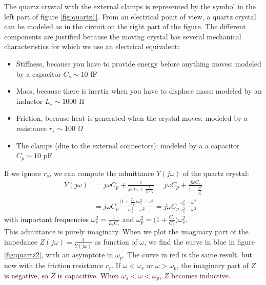 The quartz crystal with the external clamps is represented by the symbol in the left part of figure \ref{fig:quartz1}. From an electrical point of view, a quartz crystal can be modeled as in the circuit on the right part of the figure. The different components are justified because the moving crystal has several mechanical characteristics for which we use an electrical equivalent:
\begin{itemize}
	\item Stiffness, because you have to provide energy before anything moves: modeled by a capacitor $C_s \sim 10$ fF
	\item Mass, because there is inertia when you have to displace mass: modeled by an inductor $L_s \sim 1000$ H
	\item Friction, because heat is generated when the crystal moves: modeled by a resistance $r_s \sim 100 \; \Omega$
	\item The clamps (due to the external connectors): modeled by a a capacitor $C_p \sim 10$ pF
\end{itemize}
If we ignore $r_s$, we can compute the admittance $Y(j\omega)$ of the quartz crystal:
\begin{align*}
	Y(j\omega) &= j\omega C_p + \frac{1}{j\omega L_s + \frac{1}{j\omega C_s}} = j\omega C_p + \frac{j\omega C_s}{1 - \frac{\omega^2}{\omega_s^2}} \\
			   &= j\omega C_p \frac{\big(1 + \frac{C_s}{C_p} \big) \omega_s^2 - \omega^2}{\omega_s^2 - \omega^2} = j\omega C_p \frac{\omega_p^2 - \omega^2}{\omega_s^2 - \omega^2}
\end{align*}
with important frequencies $\omega_s^2 = \frac{1}{L_s C_s}$ and $\omega_p^2 =  \big(1 + \frac{C_s}{C_p} \big) \omega_s^2$.\\
This admittance is purely imaginary. When we plot the imaginary part of the impedance $Z(j\omega) = \frac{1}{Y(j\omega)}$ as function of $\omega$, we find the  curve in blue in figure \ref{fig:quartz2}, with an asymptote in $\omega_p$. The curve in red is the same result, but now with the friction resistance $r_c$. If $\omega < \omega_s$ or $\omega > \omega_p$, the imaginary part of $Z$ is negative, so $Z$ is capacitive. When $\omega_s < \omega < \omega_p$, $Z$ becomes inductive.


